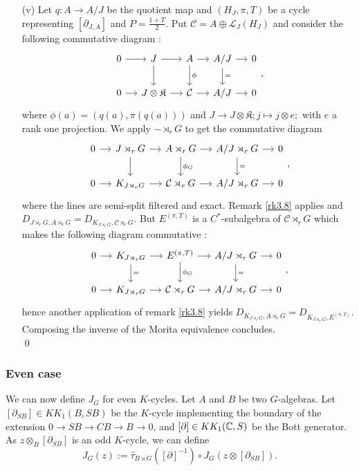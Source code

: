 \begin{dem}
\begin{enumerate}
\item[(v)] Let $q:A\rightarrow A/J$ be the quotient map and $(H_J, \pi, T)$ be a cycle representing $[\partial_{J,A}]$ and $P=\frac{1+T}{2}$. Put $\mathcal C=A\oplus \mathcal L_J(H_J)$ and consider the following commutative diagram :
\[\begin{tikzcd}[column sep = small]
0\arrow{r} &J\arrow{r}\arrow{d} & A \arrow{r}\arrow{d}{\phi}& A/J\arrow{r}\arrow{d}{=} & 0\\
0\arrow{r} & J\otimes \mathfrak K\arrow{r} & \mathcal C \arrow{r}& A/J\arrow{r} & 0
\end{tikzcd},\]
where $\phi(a) = (q(a),\pi(q(a)))$ and $J\rightarrow J\otimes \mathfrak K; j\mapsto j\otimes e;$ with $e$ a rank one projection. We apply $-\rtimes_r G$ to get the commutative diagram
\[\begin{tikzcd}[column sep = small]
0\arrow{r} & J\rtimes_r G\arrow{r}\arrow{d} & A\rtimes_r G \arrow{r}\arrow{d}{\phi_G}& A/J\rtimes_r G\arrow{r}\arrow{d}{=} & 0\\
0\arrow{r} &  K_{J\rtimes_r G}\arrow{r} & \mathcal C\rtimes_r G \arrow{r}& A/J\rtimes_r G\arrow{r} & 0
\end{tikzcd},\]
where the lines are semi-split filtered and exact. Remark \ref{rk3.8} applies and $D_{J\rtimes_r G,A\rtimes_r G} = D_{ K_{J\rtimes_r G},\mathcal C\rtimes_r G}$. But $E^{(\pi,T)}$ is a $C^*$-subalgebra of $\mathcal C\rtimes_r G$ which makes the following diagram commutative :
\[\begin{tikzcd}[column sep = small]
0\arrow{r} &  K_{J\rtimes_r G}\arrow{r}\arrow{d}{=} & E^{(\pi,T)} \arrow{r}\arrow{d}{\phi_G}& A/J\rtimes_r G\arrow{r}\arrow{d}{=} & 0\\
0\arrow{r} &  K_{J\rtimes_r G}\arrow{r} & \mathcal C\rtimes_r G\arrow{r}& A/J\rtimes_r G\arrow{r} & 0
\end{tikzcd},\]
hence another application of remark \ref{rk3.8} yields $D_{K_{J\rtimes_r G},A\rtimes_r G} = D_{K_{J\rtimes_r G},E^{(\pi,T)}}$. Composing the inverse of the Morita equivalence concludes.\\
\qed
\end{enumerate}
\end{dem}

\subsubsection{Even case}

We can now define $J_G$ for even $K$-cycles. Let $A$ and $B$ be two $G$-algebras. Let $[\partial_{SB}]\in KK_1(B,SB)$ be the $K$-cycle implementing the boundary of the extension $0\rightarrow SB\rightarrow CB\rightarrow B\rightarrow 0$, and $[\partial]\in KK_1(\mathbb C,S)$ be the Bott generator. As $z\otimes_B [\partial_{SB}]$ is an odd $K$-cycle, we can define
\[J_G(z):= \hat\tau_{B\rtimes G}([\partial]^{-1})\circ J_G(z\otimes[\partial_{SB}]).\] 


